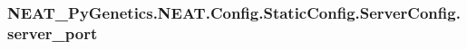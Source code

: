 \subsubsection[{\texorpdfstring{server\+\_\+port}{server_port}}]{\setlength{\rightskip}{0pt plus 5cm}N\+E\+A\+T\+\_\+\+Py\+Genetics.\+N\+E\+A\+T.\+Config.\+Static\+Config.\+Server\+Config.\+server\+\_\+port}\hypertarget{namespaceNEAT__PyGenetics_1_1NEAT_1_1Config_1_1StaticConfig_1_1ServerConfig_a68bc5297b799dc20893a8e8080b5333f}{}\label{namespaceNEAT__PyGenetics_1_1NEAT_1_1Config_1_1StaticConfig_1_1ServerConfig_a68bc5297b799dc20893a8e8080b5333f}
